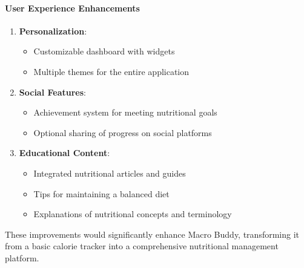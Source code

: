 \documentclass[a4paper,10pt]{article}
\begin{document}
        \paragraph{User Experience Enhancements}

        \begin{enumerate}
            \item \textbf{Personalization}:
            \begin{itemize}
                \item Customizable dashboard with widgets
                \item Multiple themes for the entire application
            \end{itemize}

            \item \textbf{Social Features}:
            \begin{itemize}
                \item Achievement system for meeting nutritional goals
                \item Optional sharing of progress on social platforms
            \end{itemize}

            \item \textbf{Educational Content}:
            \begin{itemize}
                \item Integrated nutritional articles and guides
                \item Tips for maintaining a balanced diet
                \item Explanations of nutritional concepts and terminology
            \end{itemize}
        \end{enumerate}

        These improvements would significantly enhance Macro Buddy, transforming it from a basic calorie tracker into a comprehensive nutritional management platform.
\end{document}
